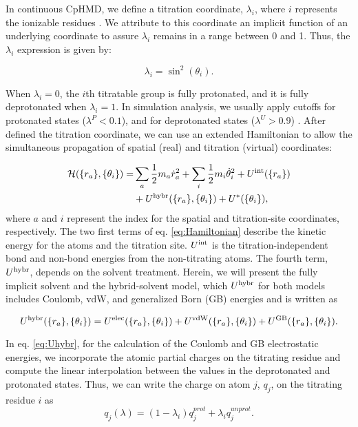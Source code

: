 \documentclass[9pt,tutorial]{livecoms}
\begin{document}
In continuous CpHMD, we define a titration coordinate, $\lambda_i$, where $i$ represents the ionizable residues \cite{Huang_Shen_2018_J.Chem.Inf.Model.}. We attribute to this coordinate an implicit function of an underlying coordinate to assure $\lambda_i$ remains in a range between 0 and 1. Thus, the $\lambda_i$ expression is given by:

\begin{equation}
    \lambda_i = \sin^2(\theta_i).
\end{equation}

When $\lambda_i = 0$, the $i$th titratable group is fully protonated, and it is fully deprotonated when $\lambda_i = 1$. In simulation analysis, we usually apply cutoffs for protonated states ($\lambda^P < 0.1$), and for deprotonated states ($\lambda^U > 0.9$) \cite{}. After defined the titration coordinate, we can use an extended Hamiltonian to allow the simultaneous propagation of spatial (real) and titration (virtual) coordinates:

\begin{equation}
\begin{split}
\label{eq:Hamiltonian}
\mathcal{H}(\{r_a\},\{\theta_i\})=
&\sum_a\frac{1}{2}m_a\dot{r}_a^2+\sum_i\frac{1}{2}m_i\dot{\theta}_i^2+U^{\rm int}(\{r_a\})\\
&+U^{\rm hybr}(\{r_a\},\{\theta_i\})+U^{\ast}(\{\theta_i\}),
\end{split}
\end{equation}
where $a$ and $i$ represent the index for the spatial and titration-site coordinates, respectively. The two first terms of eq. \ref{eq:Hamiltonian} describe the kinetic energy for the atoms and the titration site. $U^{\rm int}$ is the titration-independent bond and non-bond energies from the non-titrating atoms. The fourth term, $U^{\rm hybr}$, depends on the solvent treatment. Herein, we will present the fully implicit solvent and the hybrid-solvent model, which $U^{\rm hybr}$ for both models includes Coulomb, vdW, and generalized Born (GB) energies and is written as 

\begin{equation}
\label{eq:Uhybr}
U^{\rm hybr}(\{r_a\},\{\theta_i\})=U^{\rm elec}(\{r_a\},\{\theta_i\})+
U^{\rm vdW}(\{r_a\},\{\theta_i\})+U^{\rm GB}(\{r_a\},\{\theta_i\}).
\end{equation}

In eq. \ref{eq:Uhybr}, for the calculation of the Coulomb and GB electrostatic energies, we incorporate the atomic partial charges on the titrating residue and compute the linear interpolation between the values in the deprotonated and protonated states. Thus, we can write the charge on atom $j$, $q_j$, on the titrating residue $i$ as
%
\begin{equation}
q_j(\lambda) = (1-\lambda_i) q_j^{prot} +  \lambda_i q_j^{unprot}.
\label{eq:qlamb}
\end{equation}
\end{document}
